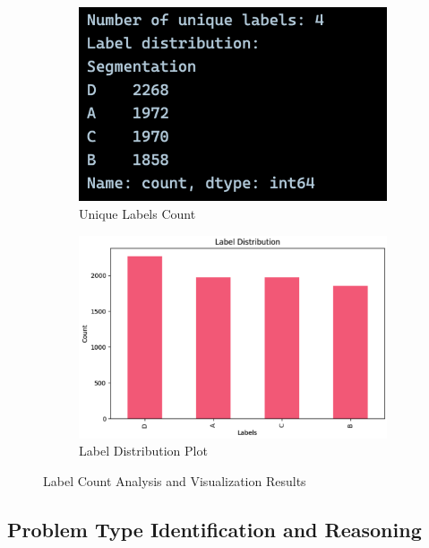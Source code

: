 \documentclass[12pt,a4paper]{article}
\begin{document}
\begin{figure}[h!]
\centering
\begin{subfigure}[b]{0.45\textwidth}
    \centering
    \includegraphics[width=\textwidth]{Figures/unique_labels_count.png}
    \caption{Unique Labels Count}
    \label{fig:unique_labels}
\end{subfigure}
\hfill
\begin{subfigure}[b]{0.45\textwidth}
    \centering
    \includegraphics[width=\textwidth]{Figures/label_distribution_plot.png}
    \caption{Label Distribution Plot}
    \label{fig:label_plot}
\end{subfigure}
\caption{Label Count Analysis and Visualization Results}
\label{fig:label_analysis}
\end{figure}

\subsection{Problem Type Identification and Reasoning}
\end{document}
